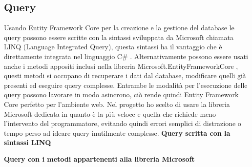 \subsection{Query}
Usando Entity Framework Core per la creazione e la gestione del database le query possono essere scritte con la sintassi sviluppata da Microsoft chiamata LINQ (Language Integrated Query), questa sintassi ha il vantaggio che è direttamente integrata nel linguaggio C\# \cite{LINQ}. Alternativamente possono essere usati anche i metodi appositi inclusi nella libreria Microsoft.EntityFrameworkCore \cite{Microsoft.EFcore}, questi metodi si occupano di recuperare i dati dal database, modificare quelli già presenti ed eseguire query complesse. Entrambe le modalità per l'esecuzione delle query possono lavorare in modo asincrono, ciò rende quindi Entity Framework Core perfetto per l'ambiente web. Nel progetto ho scelto di usare la libreria Microsoft dedicata in quanto è la più veloce e quella che richiede meno l'intervento del programmatore, evitando quindi errori semplici di distrazione o tempo perso ad ideare query inutilmente complesse. 
\clearpage
\textbf{Query scritta con la sintassi LINQ}

\bigskip
\bigskip

\textbf{Query con i metodi appartenenti alla libreria Microsoft}
